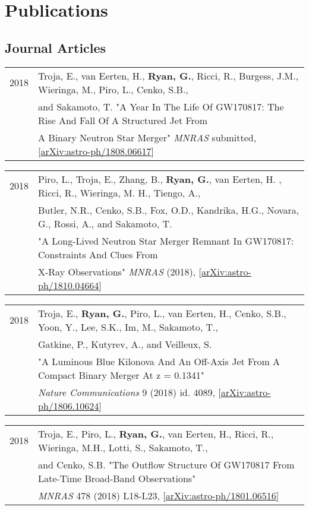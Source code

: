 \documentclass[letterpaper]{article}
\renewenvironment{itemize}{
  \begin{list}{}{
    \setlength{\leftmargin}{1.5em}
  }
}{
  \end{list}
}
\begin{document}
\section*{Publications}
\subsection*{Journal Articles}
\begin{itemize}

\item \begin{tabular}{ll}
2018 & Troja, E., van Eerten, H., {\bf Ryan, G.}, Ricci, R., Burgess, J.M., Wieringa, M., Piro, L., Cenko, S.B.,\\
	& and Sakamoto, T. "A Year In The Life Of GW170817: The Rise And Fall Of A Structured Jet From\\
	&  A Binary Neutron Star Merger" \emph{MNRAS} submitted, [\href{https://arxiv.org/abs/1808.06617}{arXiv:astro-ph/1808.06617}]
\end{tabular}

\item \begin{tabular}{ll}
2018 &  Piro, L., Troja, E., Zhang, B., {\bf Ryan, G.}, van Eerten, H. , Ricci, R., Wieringa, M. H., Tiengo, A.,\\
	& Butler, N.R., Cenko, S.B., Fox, O.D., Kandrika, H.G., Novara, G., Rossi, A., and Sakamoto, T. \\
	& "A Long-Lived Neutron Star Merger Remnant In GW170817: Constraints And Clues From\\
	& X-Ray Observations" \emph{MNRAS} (2018), [\href{https://arxiv.org/abs/1810.04664}{arXiv:astro-ph/1810.04664}]
\end{tabular}

\item \begin{tabular}{ll}
2018 & Troja, E., {\bf Ryan, G.}, Piro, L., van Eerten, H., Cenko, S.B., Yoon, Y., Lee, S.K., Im, M., Sakamoto, T., \\
	& Gatkine, P., Kutyrev, A., and Veilleux, S. \\
	& "A Luminous Blue Kilonova And An Off-Axis Jet From A Compact Binary Merger At z = 0.1341"\\
	& \emph{Nature Communications} 9 (2018) id. 4089, [\href{https://arxiv.org/abs/1806.10624}{arXiv:astro-ph/1806.10624}]
\end{tabular}

\item \begin{tabular}{ll}
2018 & Troja, E., Piro, L., {\bf Ryan, G.}, van Eerten, H., Ricci, R., Wieringa, M.H., Lotti, S., Sakamoto, T.,\\
	& and Cenko, S.B. "The Outflow Structure Of GW170817 From Late-Time Broad-Band Observations" \\
	& \emph{MNRAS} 478 (2018) L18-L23, [\href{https://arxiv.org/abs/1801.06516}{arXiv:astro-ph/1801.06516}]
\end{tabular}


\end{itemize}
\end{document}
